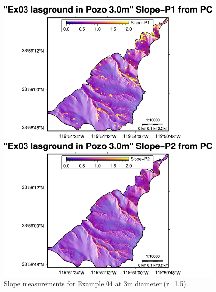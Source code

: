 \documentclass[a4paperpaper,,tablecaptionabove]{scrartcl}
\begin{document}
\begin{figure}
\centering
\includegraphics[width=\textwidth,height=0.9\textheight]{./tex2pdf.-e6884bf2dada0f3b/19d5cf796134d90581ea2ee890f5e77a95cd84a5.png}
\caption{Slope measurements for Example 04 at 3m diameter
(r=1.5).\label{Fig:Ex04_cl2_3.0m_2panel_SLPs}}
\end{figure}
\end{document}
